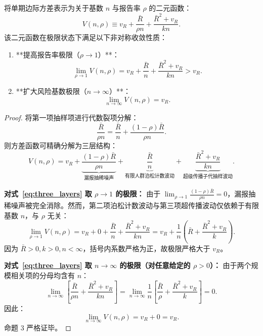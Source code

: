\begin{proposition}\label{prop:prop3}
将单期边际方差表示为关于基数 $n$ 与报告率 $\rho$ 的二元函数：
\begin{equation}
V(n, \rho) \equiv v_R + \frac{\bar{R}}{\rho n} + \frac{\bar{R}^2 + v_R}{kn}.
\end{equation}
该二元函数在极限状态下满足以下非对称收敛性质：
\begin{enumerate}[label=(\roman*)]
    \item **提高报告率极限（$\rho \to 1$）**：
    \begin{equation}
    \lim_{\rho \to 1} V(n, \rho) = v_R + \frac{\bar{R}}{n} + \frac{\bar{R}^2 + v_R}{kn} > v_R. \label{eq:lim_rho}
    \end{equation}
    \item **扩大风险基数极限（$n \to \infty$）**：
    \begin{equation}
    \lim_{n \to \infty} V(n, \rho) = v_R. \label{eq:lim_n}
    \end{equation}
\end{enumerate}
\end{proposition}

\begin{proof}
将第一项抽样项进行代数裂项分解：
\begin{equation}
\frac{\bar{R}}{\rho n} = \frac{\bar{R}}{n} + \frac{(1 - \rho)\bar{R}}{\rho n}. \label{eq:split_decomp}
\end{equation}
则方差函数可精确分解为三层结构：
\begin{equation}
V(n, \rho) = v_R + \underbrace{\frac{(1 - \rho)\bar{R}}{\rho n}}_{\text{漏报抽稀噪声}} + \underbrace{\frac{\bar{R}}{n}}_{\text{有限人群泊松计数波动}} + \underbrace{\frac{\bar{R}^2 + v_R}{kn}}_{\text{超级传播子代抽样波动}}. \label{eq:three_layers}
\end{equation}

\textbf{对式~\eqref{eq:three_layers} 取 $\rho \to 1$ 的极限：}
由于 $\lim_{\rho \to 1} \frac{(1-\rho)\bar{R}}{\rho n} = 0$，漏报抽稀噪声被完全消除。然而，第二项泊松计数波动与第三项超传播波动仅依赖于有限基数 $n$，与 $\rho$ 无关：
\begin{equation}
\lim_{\rho \to 1} V(n, \rho) = v_R + 0 + \frac{\bar{R}}{n} + \frac{\bar{R}^2 + v_R}{kn} = v_R + \frac{1}{n}\left( \bar{R} + \frac{\bar{R}^2 + v_R}{k} \right).
\end{equation}
因为 $\bar{R} > 0, k > 0, n < \infty$，括号内系数严格为正，故极限严格大于 $v_R$。

\textbf{对式~\eqref{eq:three_layers} 取 $n \to \infty$ 的极限（对任意给定的 $\rho > 0$）：}
由于两个规模相关项的分母均含有 $n$：
\begin{equation}
\lim_{n \to \infty} \left[ \frac{\bar{R}}{\rho n} + \frac{\bar{R}^2 + v_R}{kn} \right] = \lim_{n \to \infty} \frac{1}{n} \left[ \frac{\bar{R}}{\rho} + \frac{\bar{R}^2 + v_R}{k} \right] = 0.
\end{equation}
因此：
\begin{equation}
\lim_{n \to \infty} V(n, \rho) = v_R + 0 = v_R.
\end{equation}
命题 3 严格证毕。
\end{proof}

